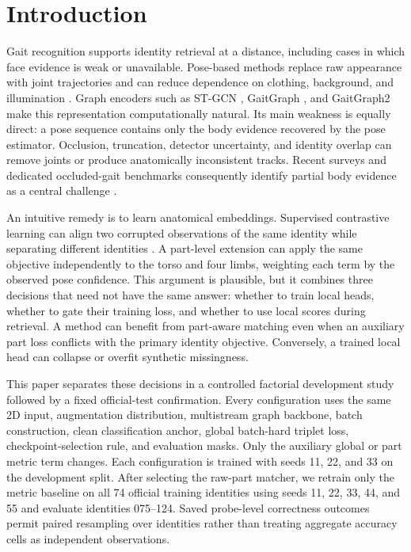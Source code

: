 \documentclass[runningheads]{llncs}
\begin{document}
\section{Introduction}

Gait recognition supports identity retrieval at a distance, including cases in
which face evidence is weak or unavailable. Pose-based methods replace raw
appearance with joint trajectories and can reduce dependence on clothing,
background, and illumination \cite{liao2020posegait}. Graph encoders such as
ST-GCN \cite{yan2018stgcn}, GaitGraph \cite{teepe2021gaitgraph}, and GaitGraph2
\cite{teepe2022gaitgraph2} make this representation computationally natural.
Its main weakness is equally direct: a pose sequence
contains only the body evidence recovered by the pose estimator. Occlusion,
truncation, detector uncertainty, and identity overlap can remove joints or
produce anatomically inconsistent tracks. Recent surveys and dedicated
occluded-gait benchmarks consequently identify partial body evidence as a
central challenge \cite{li2024survey,huang2024occluded}.

An intuitive remedy is to learn anatomical embeddings. Supervised contrastive
learning can align two corrupted observations of the same identity while
separating different identities \cite{khosla2020supervised}. A part-level
extension can apply the same objective independently to the torso and four
limbs, weighting each term by the observed pose confidence. This argument is
plausible, but it combines three decisions that need not have the same answer:
whether to train local heads, whether to gate their training loss, and whether
to use local scores during retrieval. A method can benefit from part-aware
matching even when an auxiliary part loss conflicts with the primary identity
objective. Conversely, a trained local head can collapse or overfit synthetic
missingness.

This paper separates these decisions in a controlled factorial development
study followed by a fixed official-test confirmation. Every
configuration uses the same 2D input, augmentation distribution, multistream
graph backbone, batch construction, clean classification anchor, global
batch-hard triplet loss, checkpoint-selection rule, and evaluation masks. Only
the auxiliary global or part metric term changes. Each configuration is trained
with seeds 11, 22, and 33 on the development split. After selecting the raw-part
matcher, we retrain only the metric baseline on all 74 official training
identities using seeds 11, 22, 33, 44, and 55 and evaluate identities 075--124.
Saved probe-level correctness outcomes permit paired resampling over identities
rather than treating aggregate accuracy cells as independent observations.
\end{document}
